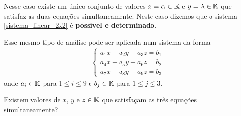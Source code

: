 \documentclass{beamer}
\begin{document}
    \begin{frame}
        \begin{center}
        \end{center}
        
        Nesse caso existe um único conjunto de valores $x = \alpha \in \mathbb{K}$ e $y = \lambda \in \mathbb{K}$ \pause que satisfaz as duas equações simultaneamente. \pause Neste caso dizemos que o sistema \eqref{sistema_linear_2x2} \pause é \textbf{possível e determinado}.\pause
    \end{frame}

    \begin{frame}
        Esse mesmo tipo de análise pode ser aplicada num sistema da forma
        \begin{align}
            \begin{cases}\label{sistema_linear_3x3}
                a_1x + a_2y + a_3z = b_1\\
                a_4x + a_5y + a_6z = b_2\\
                a_7x + a_8y + a_9z = b_3
            \end{cases}
        \end{align}
        onde $a_i \in \mathbb{K}$ para $1 \le i \le 9$ e $b_j \in \mathbb{K}$ para $1 \le j \le 3$.\pause

        \vspace{.3cm}

        Existem valores de $x$, $y$ e $z \in \mathbb{K}$ que satisfaçam as três equações simultaneamente?
    \end{frame}
    
\end{document}
